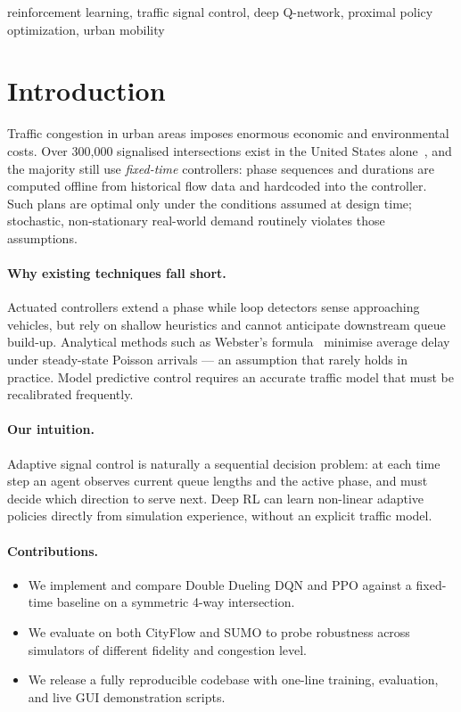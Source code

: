\documentclass[twoside,11pt]{article}
\begin{document}
\begin{keywords}
  reinforcement learning, traffic signal control, deep Q-network,
  proximal policy optimization, urban mobility
\end{keywords}

\section{Introduction}

Traffic congestion in urban areas imposes enormous economic and environmental
costs.  Over 300,000 signalised intersections exist in the United States
alone~\citep{schrank2021tti}, and the majority still use \emph{fixed-time}
controllers: phase sequences and durations are computed offline from historical
flow data and hardcoded into the controller.  Such plans are optimal only under
the conditions assumed at design time; stochastic, non-stationary real-world
demand routinely violates those assumptions.

\paragraph{Why existing techniques fall short.}
Actuated controllers extend a phase while loop detectors sense approaching
vehicles, but rely on shallow heuristics and cannot anticipate downstream queue
build-up.  Analytical methods such as Webster's formula~\citep{webster1958}
minimise average delay under steady-state Poisson arrivals — an assumption
that rarely holds in practice.  Model predictive control requires an accurate
traffic model that must be recalibrated frequently.

\paragraph{Our intuition.}
Adaptive signal control is naturally a sequential decision problem: at each
time step an agent observes current queue lengths and the active phase, and
must decide which direction to serve next.  Deep RL can learn non-linear
adaptive policies directly from simulation experience, without an explicit
traffic model.

\paragraph{Contributions.}
\begin{itemize}
  \item We implement and compare Double Dueling DQN and PPO against a
        fixed-time baseline on a symmetric 4-way intersection.
  \item We evaluate on both CityFlow and SUMO to probe robustness across
        simulators of different fidelity and congestion level.
  \item We release a fully reproducible codebase with one-line training,
        evaluation, and live GUI demonstration scripts.
\end{itemize}
\end{document}
